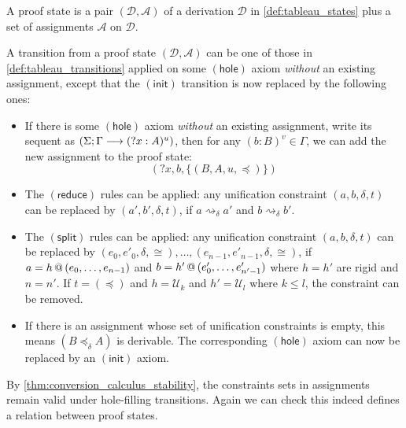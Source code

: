 \documentclass[twoside]{report}
\begin{document}
\begin{definition}
\label{def:tableau_states_with_constraints}
A proof state is a pair $(\mathcal D, \mathcal A)$ of a derivation $\mathcal D$ in \cref{def:tableau_states} plus a set of assignments $\mathcal A$ on $\mathcal D$.
\end{definition}

\begin{definition}
\label{def:tableau_transitions_with_constraints}
A transition from a proof state $(\mathcal D, \mathcal A)$ can be one of those in \cref{def:tableau_transitions} applied on some $(\mathsf{hole})$ axiom \emph{without} an existing assignment, except that the $(\mathsf{init})$ transition is now replaced by the following ones:
\begin{itemize}
    \item If there is some $(\mathsf{hole})$ axiom \emph{without} an existing assignment, write its sequent as $(\Sigma; \Gamma \longrightarrow ({?x} : A)^u)$, then for any $(b : B)^v \in \Gamma$, we can add the new assignment to the proof state:
    $$({?x}, b, \{(B, A, u, \preceq)\})$$

    \item The $(\mathsf{reduce})$ rules can be applied: any unification constraint $(a, b, \delta, t)$ can be replaced by $(a', b', \delta, t)$, if $a \rightsquigarrow_\delta a'$ and $b \rightsquigarrow_\delta b'$.

    \item The $(\mathsf{split})$ rules can be applied: any unification constraint $(a, b, \delta, t)$ can be replaced by $(e_0, e'_0, \delta, \cong), \ldots, (e_{n-1}, e'_{n-1}, \delta, \cong)$, if $a = {h}\,@\,({e_0, \ldots, e_{n-1}})$ and $b = {h'}\,@\,({e'_0, \ldots, e'_{n'-1}})$ where $h = h'$ are rigid and $n = n'$. If $t = (\preceq)$ and $h = \mathcal U_k$ and $h' = \mathcal U_l$ where $k \leq l$, the constraint can be removed.

    \item If there is an assignment whose set of unification constraints is empty, this means $(B \preceq_\delta A)$ is derivable. The corresponding $(\mathsf{hole})$ axiom can now be replaced by an $(\mathsf{init})$ axiom.
\end{itemize}
By \cref{thm:conversion_calculus_stability}, the constraints sets in assignments remain valid under hole-filling transitions. Again we can check this indeed defines a relation between proof states.
\end{definition}
\end{document}

